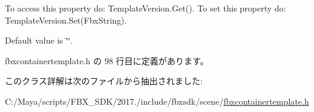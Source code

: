 To access this property do\+: Template\+Version.\+Get(). To set this property do\+: Template\+Version.\+Set(\+Fbx\+String).

Default value is \char`\"{}\char`\"{}. 

 fbxcontainertemplate.\+h の 98 行目に定義があります。



このクラス詳解は次のファイルから抽出されました\+:\begin{DoxyCompactItemize}
\item 
C\+:/\+Maya/scripts/\+F\+B\+X\+\_\+\+S\+D\+K/2017./include/fbxsdk/scene/\hyperlink{fbxcontainertemplate_8h}{fbxcontainertemplate.\+h}\end{DoxyCompactItemize}
